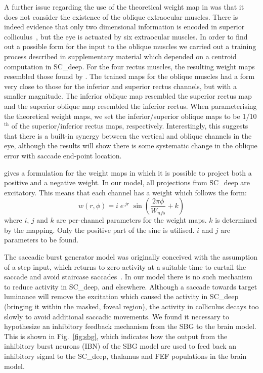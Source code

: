 \documentclass{frontiersSCNS}
\begin{document}
A further issue regarding the use of the theoretical weight map
in \cite{tabareau_geometry_2007} was that it does not consider the
existence of the oblique extraocular muscles. There is indeed evidence that
only two dimensional information is encoded in superior
colliculus~\cite{wurtz_activity_1972,van_opstal_two-rather_1991}, but the
eye is actuated by six extraocular muscles. In order to find out a
possible form for the input to the oblique muscles we carried out a
training process described in supplementary material which depended on a
centroid computation in SC\_deep. For the four rectus muscles, the
resulting weight maps resembled those found by
\cite{arai_two-dimensional_1994}. The trained
maps for the oblique muscles had a form very close to those for the
inferior and superior rectus channels, but with a smaller magnitude.
The inferior oblique map resembled the superior rectus map and the
superior oblique map resembled the inferior rectus. When parameterising
the theoretical weight maps, we set the inferior/superior
oblique maps to be 1/10$^{\mathrm{th}}$ of the superior/inferior rectus
maps, respectively. Interestingly, this suggests that there is a built-in
synergy between the vertical and oblique channels in the eye, although
the results will show there is some systematic change in the oblique error
with saccade end-point location.

\cite{tabareau_geometry_2007} gives a formulation for the weight maps
in which it is possible to project both a positive and a negative
weight. In our model, all projections from SC\_deep are excitatory.
This means that each channel has a weight which follows the form:
\begin{equation} \label{eq:weightmaps}
w(r,\phi) = i\;e\,^{jr}\;\sin\left(\frac{2\pi\phi}{W_{nfs}} + k\right)
\end{equation}
where $i$, $j$ and $k$ are per-channel parameters for the weight
maps. $k$ is determined by the mapping. Only the positive part of the
sine is utilised. $i$ and $j$ are parameters to be found.

The saccadic burst generator model was originally conceived with the
assumption of a step input, which returns to zero activity at a suitable
time to curtail the saccade and avoid staircase
saccades~\cite{gancarz_neural_1998}. In our model
there is no such mechanism to reduce activity in SC\_deep, and elsewhere.
Although a saccade towards target luminance will remove the excitation
which caused the activity in SC\_deep (bringing it within the masked,
foveal region), the activity in colliculus decays too slowly to avoid
additional saccadic movements. We found it necessary to hypothesize
an inhibitory feedback mechanism from the SBG to the brain model.
This is shown in Fig.~\ref{fig:sbg}, which indicates how the output from
the inhibitory burst neurons  (IBN) of the SBG model are used to feed
back an inhibitory signal to the SC\_deep, thalamus and FEF populations
in the brain model.
\end{document}

